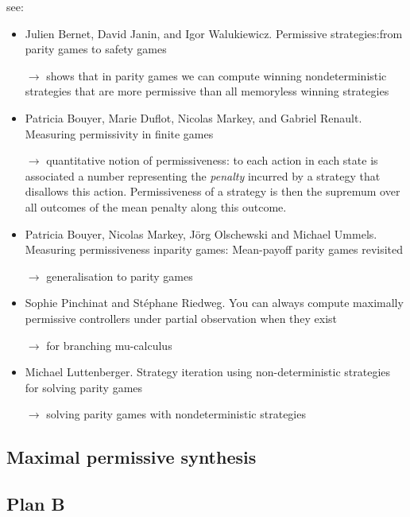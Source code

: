see:
\begin{itemize}
\item Julien Bernet, David Janin, and Igor Walukiewicz. Permissive
  strategies:from parity games to safety games

  $\rightarrow$ shows that in parity games we can compute winning nondeterministic
  strategies that are more permissive than all memoryless winning strategies
\item Patricia Bouyer, Marie Duflot, Nicolas Markey, and Gabriel
  Renault. Measuring permissivity in finite games

  $\rightarrow$ quantitative notion of permissiveness: to each action in
  each state is associated a number representing the \emph{penalty}
  incurred by a strategy that disallows this action. Permissiveness of
  a strategy is then the supremum over all outcomes of the mean
  penalty along this outcome.
  
\item Patricia Bouyer, Nicolas Markey, Jörg Olschewski and Michael
  Ummels. Measuring permissiveness inparity games: Mean-payoff parity
  games revisited

  $\rightarrow$ generalisation to parity games
  
\item Sophie Pinchinat and Stéphane Riedweg. You can always compute
  maximally permissive controllers under partial observation when they
  exist
  
$\rightarrow$   for branching mu-calculus

  
\item Michael Luttenberger. Strategy iteration using non-deterministic
  strategies for solving parity games  

$\rightarrow$ solving parity games with nondeterministic strategies

\end{itemize}


\subsection{Maximal permissive synthesis}



\subsection{Plan B}



